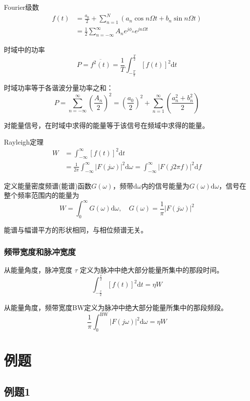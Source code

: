 \documentclass[UTF8]{ctexart}
\begin{document}
Fourier级数
\begin{align*} f(t) &= \frac{a_0}{2} + \sum_{n=1}^{N}\left( a_n \cos n\Omega t + b_n \sin n\Omega t \right) \\ &= \frac{1}{2}\sum_{n=-\infty}^{\infty} A_n e^{j\phi_n} e^{jn\Omega t} \end{align*}

时域中的功率
$$
P = \overline{f^2(t)} = \frac{1}{T}\int_{-\frac{T}{2}}^{\frac{T}{2}} \left[f(t)\right]^2 \mathrm{d}t
$$

时域功率等于各谐波分量功率之和：
$$
P = \sum_{n=-\infty}^{\infty}\left( \frac{A_n}{2} \right)^2 = \left( \frac{a_0}{2} \right)^2 + \sum_{n=1}^{\infty}\left( \frac{a_n^2+b_n^2}{2} \right)
$$

对能量信号，在时域中求得的能量等于该信号在频域中求得的能量。

Rayleigh定理
\begin{align*} W &= \int_{-\infty}^{\infty} \left[f(t)\right]^2 \mathrm{d}t \\ &= \frac{1}{2\pi}\int_{-\infty}^{\infty} \left|F(j\omega)\right|^2 \mathrm{d}\omega = \int_{-\infty}^{\infty} \left|F(j2\pi f)\right|^2 \mathrm{d}f \end{align*}

定义能量密度频谱(能谱)函数$G(\omega)$，频带$\mathrm{d}\omega$内的信号能量为$G(\omega)\mathrm{d}\omega$，信号在整个频率范围内的能量为
$$
W = \int_{0}^{\infty} G(\omega)\mathrm{d}\omega,\quad G(\omega) = \frac{1}{\pi}\left|F(j\omega)\right|^2
$$

能谱与幅谱平方的形状相同，与相位频谱无关。

\subsubsection{频带宽度和脉冲宽度}

从能量角度，脉冲宽度 $\tau$ 定义为脉冲中绝大部分能量所集中的那段时间。
$$
\int_{-\frac{\tau}{2}}^{\frac{\tau}{2}} \left[f(t)\right]^2 \mathrm{d}t = \eta W
$$

从能量角度，频带宽度BW定义为脉冲中绝大部分能量所集中的那段频段。
$$
\frac{1}{\pi}\int_{0}^{\mathrm{BW}} \left|F(j\omega)\right|^2 \mathrm{d}\omega = \eta W
$$

\section{例题}

\subsection{例题1}
\end{document}
